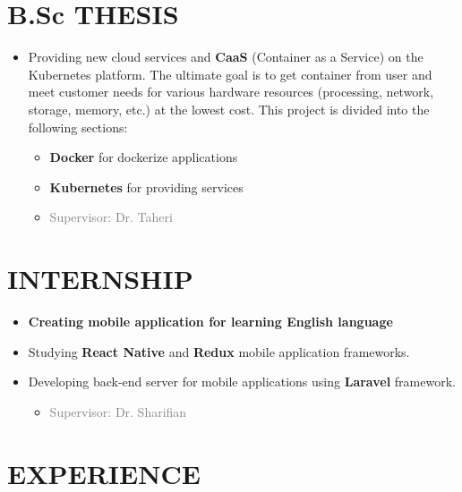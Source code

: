 \documentclass[10pt,a4paper,sans]{moderncv} %
\begin{document}
\section{B.Sc THESIS}
\begin{itemize}
	\item Providing new cloud services and \textbf{CaaS} (Container as a Service) on the Kubernetes platform. The ultimate goal is to get container from user and meet customer needs for various hardware resources (processing, network, storage, memory, etc.) at the lowest cost. This project is divided into the following sections:
	
	\begin{itemize}
		\item \textbf{Docker} for dockerize applications 
		\item \textbf{Kubernetes} for providing services
		
		\vspace{5pt}
		\item\textcolor{gray}{Supervisor: Dr. Taheri} 
	\end{itemize}
\end{itemize}

\section{INTERNSHIP}
\begin{itemize}
	\item \textbf{Creating mobile application for learning English language}
	\item Studying \textbf{React Native} and \textbf{Redux} mobile application frameworks.
	\item Developing back-end server for mobile applications using \textbf{Laravel} framework.
	\begin{itemize} 
		\item\textcolor{gray}{Supervisor: Dr. Sharifian} 
	\end{itemize}
\end{itemize}

\section{EXPERIENCE}
\end{document}
